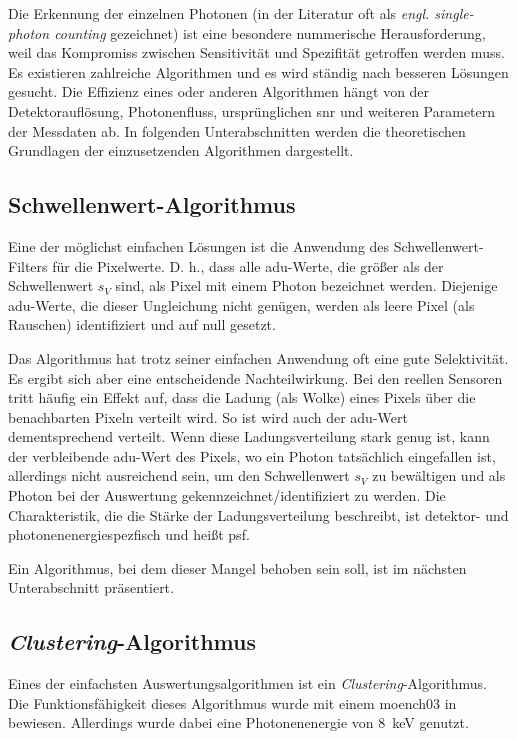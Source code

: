 \noindent
Die Erkennung der einzelnen Photonen (in der Literatur oft als \emph{engl. single-photon counting} gezeichnet) ist eine besondere nummerische Herausforderung, weil das Kompromiss zwischen Sensitivität und Spezifität getroffen werden muss. Es existieren zahlreiche Algorithmen und es wird ständig nach besseren Lösungen gesucht. Die Effizienz eines oder anderen Algorithmen hängt von der Detektorauflösung, Photonenfluss, ursprünglichen \gls{snr} und weiteren Parametern der Messdaten ab. In folgenden Unterabschnitten werden die theoretischen Grundlagen der einzusetzenden Algorithmen dargestellt.

\subsection{Schwellenwert-Algorithmus}
\label{text:threshold_algorithm}
Eine der möglichst einfachen Lösungen ist die Anwendung des Schwellenwert-Filters für die Pixelwerte. D. h., dass alle \gls{adu}-Werte, die größer als der Schwellenwert $s_V$ sind, als Pixel mit einem Photon bezeichnet werden. Diejenige \gls{adu}-Werte, die dieser Ungleichung nicht genügen, werden als leere Pixel (als Rauschen) identifiziert und auf null gesetzt.

\noindent
Das Algorithmus hat trotz seiner einfachen Anwendung oft eine gute Selektivität. Es ergibt sich aber eine entscheidende Nachteilwirkung. Bei den reellen Sensoren tritt häufig ein Effekt auf, dass die Ladung (als Wolke) eines Pixels über die benachbarten Pixeln verteilt wird. So ist wird auch der \gls{adu}-Wert dementsprechend verteilt. Wenn diese Ladungsverteilung  stark genug ist, kann der verbleibende \gls{adu}-Wert des Pixels, wo ein Photon tatsächlich eingefallen ist, allerdings nicht ausreichend sein, um den Schwellenwert $s_V$ zu bewältigen und als Photon bei der Auswertung gekennzeichnet/identifiziert zu werden. Die Charakteristik, die die Stärke der Ladungsverteilung beschreibt, ist detektor- und photonenenergiespezfisch und heißt \gls{psf}.

\noindent
Ein Algorithmus, bei dem dieser Mangel behoben sein soll, ist im nächsten Unterabschnitt präsentiert.

\subsection{\emph{Clustering}-Algorithmus}
\label{text:clustering_algorithm}
Eines der einfachsten Auswertungsalgorithmen ist ein \emph{Clustering}-Algorithmus. Die Funktionsfähigkeit dieses Algorithmus wurde mit einem \gls{moench03} in \cite{cartier_micron_2014} bewiesen. Allerdings wurde dabei eine Photonenenergie von \SI{8}{\kilo\eV} genutzt. 

